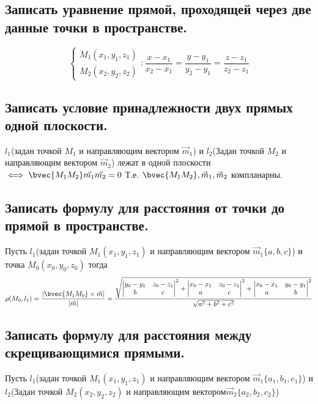 
\subsection{Записать уравнение прямой, проходящей через две данные точки в пространстве. }

$$\begin{cases}M_1(x_1,y_1,z_1)\\M_2(x_2,y_2,z_2)\end{cases}: 
\frac{x-x_1}{x_2-x_1} = \frac{y-y_1}{y_2-y_1} = \frac{z-z_1}{z_2-z_1}$$

\subsection{Записать условие принадлежности двух прямых одной плоскости.}

$l_1$(задан точкой $M_1$ и направляющим вектором $\vec{m}_1$) и $l_2$(Задан точкой $M_2$ и направляющим 
вектором $\vec{m}_2$) лежат в одной плоскости $\iff \bvec{M_1M_2}\vec{m_1}\vec{m_2} = 0$
Т.е. $\bvec{M_1M_2}, \vec{m}_1, \vec{m}_2$ компланарны. 

\subsection{Записать формулу для расстояния от точки до прямой в пространстве.}

Пусть $l_1$(задан точкой $M_1(x_1, y_1, z_1)$ и направляющим вектором $\vec{m}_1\{a,b,c\}$) и точка 
$M_0(x_0,y_0,z_0)$ тогда 
$$\rho(M_0, l_1) = \frac{ |\bvec{M_1M_0}\times\vec{m}| }{ |\vec{m}| } = 
\frac{\sqrt{\begin{vmatrix}y_0-y_1&z_0-z_1\\b&c\end{vmatrix}^2+
\begin{vmatrix}x_0-x_1&z_0-z_1\\a&c\end{vmatrix}^2+
\begin{vmatrix}x_0-x_1&y_0-y_1\\a&b\end{vmatrix}^2}}{\sqrt{a^2+b^2+c^2}}$$

\subsection{Записать формулу для расстояния между скрещивающимися прямыми.}

Пусть $l_1$(задан точкой $M_1(x_1, y_1, z_1)$ и направляющим вектором $\vec{m}_1\{a_1,b_1,c_1\}$) и 
$l_2$(Задан точкой $M_2(x_2, y_2, z_2)$ и направляющим вектором$\vec{m}_2\{a_2,b_2,c_2\}$)

